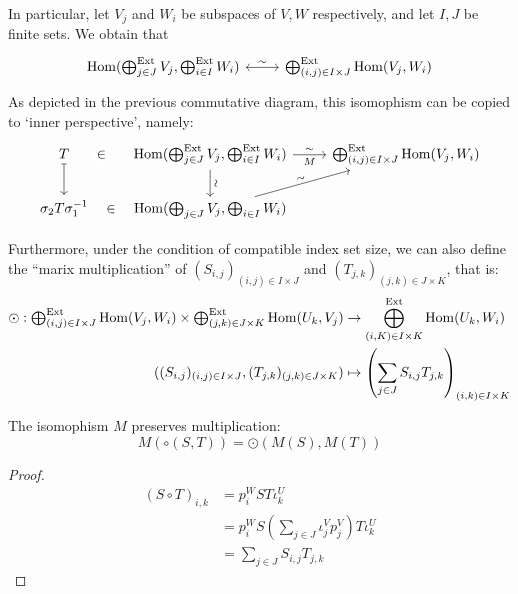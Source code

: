 In particular, let $V_j$ and $W_i$ be subspaces of $V, W$ respectively, and let $I, J$ be finite sets. We obtain that
\[
    \begin{tikzcd}
        \Hom(\bigoplus^{\Ext}_{j \in J}V_j, \bigoplus^{\Ext}_{i \in I}W_i) \arrow[leftrightarrow, r, "\sim"]
        & \bigoplus^{\Ext}_{(i, j) \in I \times J} \Hom(V_j, W_i)
    \end{tikzcd}
\]
As depicted in the previous commutative diagram, this isomophism can be copied to `inner perspective', namely: 
\[
    \begin{tikzcd}
        T \arrow[phantom, r, "\in" description, sloped] \arrow[mapsto, d]
        & \Hom(\bigoplus^{\Ext}_{j \in J}V_j, \bigoplus^{\Ext}_{i \in I}W_i) \arrow[r, "\sim", "M"'] \arrow[d, "\sim", sloped]
        & \bigoplus^{\Ext}_{(i, j) \in I \times J} \Hom(V_j, W_i) \\
        \sigma_2 T \sigma_1^{-1} \arrow[phantom, r, "\in", sloped]
        & \Hom(\bigoplus_{j \in J}V_j, \bigoplus_{i \in I}W_i) \arrow[ru, "\sim", sloped]
        &
    \end{tikzcd}
\]

Furthermore, under the condition of compatible index set size, we can also define the ``marix multiplication'' of $(S_{i, j})_{(i, j) \in I \times J}$ and $(T_{j, k})_{(j, k) \in J \times K}$, that is:
\[
    \begin{aligned}
        \textstyle \odot : \bigoplus^{\mathrm{Ext}}_{(i, j) \in I \times J} \operatorname{Hom}(V_j, W_i) \times \bigoplus^{\mathrm{Ext}}_{(j, k) \in J \times K} \operatorname{Hom}(U_k, V_j) &\to \bigoplus^{\mathrm{Ext}}_{(i, K) \in I \times K} \operatorname{Hom}(U_k, W_i) \\
        ((S_{i, j})_{(i, j) \in I \times J}, (T_{j, k})_{(j, k) \in J \times K}) & \mapsto \left( \sum_{j \in J} S_{i, j} T_{j, k} \right)_{(i, k) \in I \times K}
    \end{aligned}
\]


\begin{proposition}
The isomophism $M$ preserves multiplication:
\[
    M(\circ(S, T)) = \odot(M(S), M(T))
\]
\end{proposition}
\begin{proof}
    $$
        \begin{aligned}
            (S\circ T)_{i, k} &= p_i^W ST \iota^U_k \\
            &= p_i^W S \left( \sum_{j \in J} \iota_j^V p_j^V \right) T \iota^U_k \\
            & = \sum_{j \in J} S_{i, j} T_{j, k}
        \end{aligned}
    $$
\end{proof}




